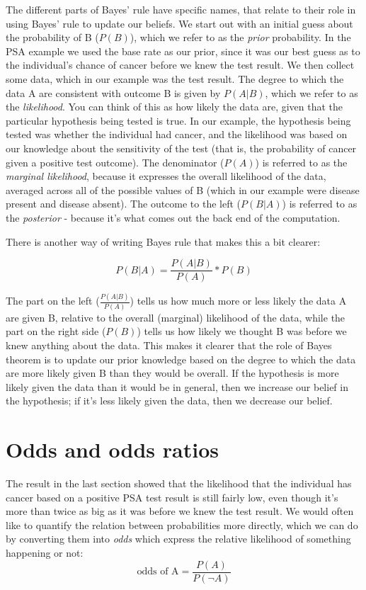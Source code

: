 \documentclass[12pt,]{book}
\theoremstyle{definition}
\theoremstyle{definition}
\theoremstyle{definition}
\theoremstyle{remark}
\begin{document}
The different parts of Bayes' rule have specific names, that relate to their role in using Bayes' rule to update our beliefs. We start out with an initial guess about the probability of B (\(P(B)\)), which we refer to as the \emph{prior} probability. In the PSA example we used the base rate as our prior, since it was our best guess as to the individual's chance of cancer before we knew the test result. We then collect some data, which in our example was the test result. The degree to which the data A are consistent with outcome B is given by \(P(A|B)\), which we refer to as the \emph{likelihood}. You can think of this as how likely the data are, given that the particular hypothesis being tested is true. In our example, the hypothesis being tested was whether the individual had cancer, and the likelihood was based on our knowledge about the sensitivity of the test (that is, the probability of cancer given a positive test outcome). The denominator (\(P(A)\)) is referred to as the \emph{marginal likelihood}, because it expresses the overall likelihood of the data, averaged across all of the possible values of B (which in our example were disease present and disease absent).
The outcome to the left (\(P(B|A)\)) is referred to as the \emph{posterior} - because it's what comes out the back end of the computation.

There is another way of writing Bayes rule that makes this a bit clearer:

\[
P(B|A) = \frac{P(A|B)}{P(A)}*P(B)
\]

The part on the left (\(\frac{P(A|B)}{P(A)}\)) tells us how much more or less likely the data A are given B, relative to the overall (marginal) likelihood of the data, while the part on the right side (\(P(B)\)) tells us how likely we thought B was before we knew anything about the data. This makes it clearer that the role of Bayes theorem is to update our prior knowledge based on the degree to which the data are more likely given B than they would be overall. If the hypothesis is more likely given the data than it would be in general, then we increase our belief in the hypothesis; if it's less likely given the data, then we decrease our belief.

\hypertarget{odds-and-odds-ratios}{%
\section{Odds and odds ratios}\label{odds-and-odds-ratios}}

The result in the last section showed that the likelihood that the individual has cancer based on a positive PSA test result is still fairly low, even though it's more than twice as big as it was before we knew the test result. We would often like to quantify the relation between probabilities more directly, which we can do by converting them into \emph{odds} which express the relative likelihood of something happening or not:\\
\[
\text{odds of A} = \frac{P(A)}{P(\neg A)}
\]
\end{document}

